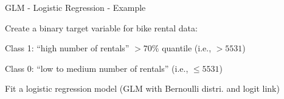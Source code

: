 \documentclass[10pt,compress,t,notes=noshow, xcolor=table]{beamer}
\begin{document}
\begin{framev}[align=top]{GLM - Logistic Regression - Example}
\begin{itemizeM}
\item Create a binary target variable for bike rental data:
\begin{itemizeS}
\item Class 1: ``high number of rentals'' $> 70\%$ quantile (i.e.,  $> 5531$)
\item Class 0: ``low to medium number of rentals'' (i.e.,  $\leq 5531$)
\end{itemizeS}
\item Fit a logistic regression model (GLM with Bernoulli distri. and logit link)
\end{itemizeM}
\end{framev}
\end{document}
